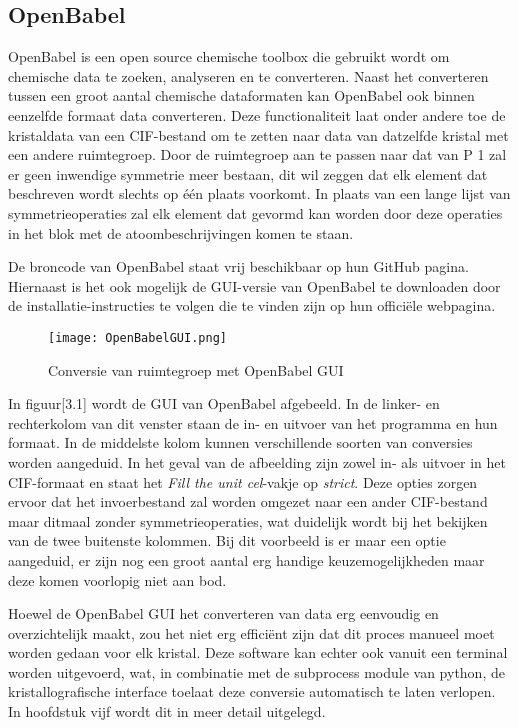 \subsection{OpenBabel}
OpenBabel is een open source chemische toolbox die gebruikt wordt om chemische data te zoeken, analyseren en te converteren.\citep*{OBAB1} Naast het converteren tussen een groot aantal chemische dataformaten kan OpenBabel ook binnen eenzelfde formaat data converteren. Deze functionaliteit laat onder andere toe de kristaldata van een CIF-bestand om te zetten naar data van datzelfde kristal met een andere ruimtegroep. Door de ruimtegroep aan te passen naar dat van P 1 zal er geen inwendige symmetrie meer bestaan, dit wil zeggen dat elk element dat beschreven wordt slechts op één plaats voorkomt. In plaats van een lange lijst van symmetrieoperaties zal elk element dat gevormd kan worden door deze operaties in het blok met de atoombeschrijvingen komen te staan.   
\par
De broncode van OpenBabel staat vrij beschikbaar op hun GitHub pagina.  Hiernaast is het ook mogelijk de GUI-versie van OpenBabel te downloaden door de installatie-instructies te volgen die te vinden zijn op hun officiële webpagina.\citep*{OBAB1}   
\par
\begin{figure}[h]
\texttt{[image: OpenBabelGUI.png]}
\caption{Conversie van ruimtegroep met OpenBabel GUI}
\end{figure}
\par
In figuur[3.1] wordt de GUI van OpenBabel afgebeeld. In de linker- en rechterkolom van dit venster staan de in- en uitvoer van het programma en hun formaat. In de middelste kolom kunnen verschillende soorten van conversies worden aangeduid. In het geval van de afbeelding zijn zowel in- als uitvoer in het CIF-formaat en staat het \textit{Fill the unit cel}-vakje op \textit{strict}. Deze opties zorgen ervoor dat het invoerbestand zal worden omgezet naar een ander CIF-bestand maar ditmaal zonder symmetrieoperaties, wat duidelijk wordt bij het bekijken van de twee buitenste kolommen. Bij dit voorbeeld is er maar een optie aangeduid, er zijn nog een groot aantal erg handige keuzemogelijkheden maar deze komen voorlopig niet aan bod.
\par
Hoewel de OpenBabel GUI het converteren van data erg eenvoudig en overzichtelijk maakt, zou het niet erg efficiënt zijn dat dit proces manueel moet worden gedaan voor elk kristal. Deze software kan echter ook vanuit een terminal worden uitgevoerd, wat, in combinatie met de subprocess module van python, de kristallografische interface toelaat deze conversie automatisch te laten verlopen. In hoofdstuk vijf wordt dit in meer detail uitgelegd.
\par     
